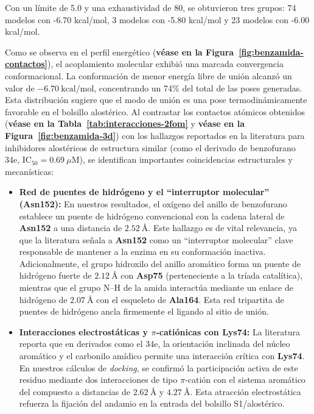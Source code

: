 \begin{table}[htbp]
Con un límite de 5.0 y una exhaustividad de 80, se obtuvieron tres grupos: 74 modelos con -6.70 kcal/mol, 3 modelos con -5.80 kcal/mol y 23 modelos con -6.00 kcal/mol. 

Como se observa en el perfil energético (\textbf{véase en la Figura~\ref{fig:benzamida-contactos}}), el acoplamiento molecular exhibió una marcada convergencia conformacional. La conformación de menor energía libre de unión alcanzó un valor de $-6.70\ \text{kcal/mol}$, concentrando un 74\% del total de las poses generadas. Esta distribución sugiere que el modo de unión es una pose termodinámicamente favorable en el bolsillo alostérico.
Al contrastar los contactos atómicos obtenidos (\textbf{véase en la Tabla~\ref{tab:interacciones-2fom}} y \textbf{véase en la Figura~\ref{fig:benzamida-3d}}) con los hallazgos reportados en la literatura para inhibidores alostéricos de estructura similar (como el derivado de benzofurano 34e, $\text{IC}_{50} = 0.69\ \mu\text{M}$), se identifican importantes coincidencias estructurales y mecanísticas:

\begin{itemize}
    \item \textbf{Red de puentes de hidrógeno y el ``interruptor molecular'' (\textbf{Asn152}):} En nuestros resultados, el oxígeno del anillo de benzofurano establece un puente de hidrógeno convencional con la cadena lateral de \textbf{Asn152} a una distancia de $2.52\ \text{\AA}$. Este hallazgo es de vital relevancia, ya que la literatura señala a \textbf{Asn152} como un ``interruptor molecular'' clave responsable de mantener a la enzima en su conformación inactiva. Adicionalmente, el grupo hidroxilo del anillo aromático forma un puente de hidrógeno fuerte de $2.12\ \text{\AA}$ con \textbf{Asp75} (perteneciente a la tríada catalítica), mientras que el grupo N--H de la amida interactúa mediante un enlace de hidrógeno de $2.07\ \text{\AA}$ con el esqueleto de \textbf{Ala164}. Esta red tripartita de puentes de hidrógeno ancla firmemente el ligando al sitio de unión.
    
    \item \textbf{Interacciones electrostáticas y $\pi$-catiónicas con \textbf{Lys74}:} La literatura reporta que en derivados como el 34e, la orientación inclinada del núcleo aromático y el carbonilo amídico permite una interacción crítica con \textbf{Lys74}. En nuestros cálculos de \textit{docking}, se confirmó la participación activa de este residuo mediante dos interacciones de tipo $\pi$-catión con el sistema aromático del compuesto a distancias de $2.62\ \text{\AA}$ y $4.27\ \text{\AA}$. Esta atracción electrostática refuerza la fijación del andamio en la entrada del bolsillo S1/alostérico.
    

\end{itemize}
\end{table}
